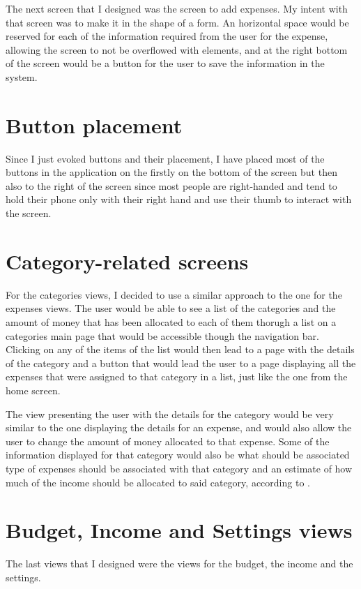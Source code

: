 The next screen that I designed was the screen to add expenses. My intent with that screen was to make it in the shape of a form. An horizontal space would be reserved for each of the information required from the user for the expense, allowing the screen to not be overflowed with elements, and at the right bottom of the screen would be a button for the user to save the information in the system.

\section{Button placement}
Since I just evoked buttons and their placement, I have placed most of the buttons in the application on the firstly on the bottom of the screen but then also to the right of the screen since most people are right-handed and tend to hold their phone only with their right hand and use their thumb to interact with the screen.

\section{Category-related screens}
For the categories views, I decided to use a similar approach to the one for the expenses views. The user would be able to see a list of the categories and the amount of money that has been allocated to each of them thorugh a list on a categories main page that would be accessible though the navigation bar. Clicking on any of the items of the list would then lead to a page with the details of the category and a button that would lead the user to a page displaying all the expenses that were assigned to that category in a list, just like the one from the home screen.

The view presenting the user with the details for the category would be very similar to the one displaying the details for an expense, and would also allow the user to change the amount of money allocated to that expense. Some of the information displayed for that category would also be what should be associated type of expenses should be associated with that category and an estimate of how much of the income should be allocated to said category, according to \cite{ukHouseholdBudget}.


\section{Budget, Income and Settings views}
The last views that I designed were the views for the budget, the income and the settings.

